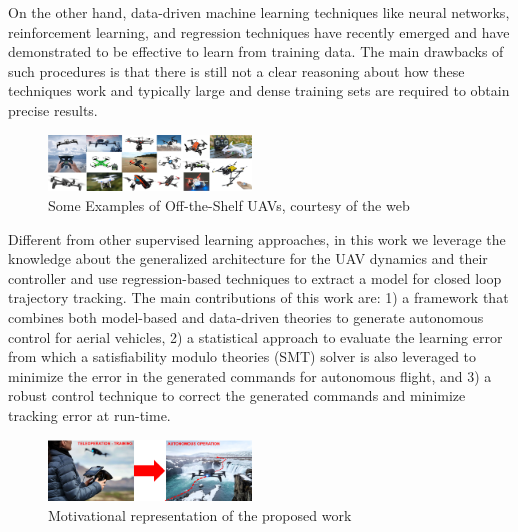 \documentclass[letterpaper, 10 pt, conference]{ieeeconf}  %
\newcommand\NB[1]{$\spadesuit$\footnote{NB: #1}}
\begin{document}
On the other hand, data-driven machine learning techniques like neural networks, reinforcement learning, and regression techniques have recently emerged and have demonstrated to be effective to learn from training data. The main drawbacks of such procedures is that there is still not a clear reasoning about how these techniques work and typically large and dense training sets are required to obtain precise results.
\begin{figure}[t]
    \includegraphics[width=0.48\textwidth]{images/quads.png}
    \vspace{-5pt}
    \caption{Some Examples of Off-the-Shelf UAVs, courtesy of the web}
    \label{fig:uavs}
    \vspace{-15pt}
\end{figure}

Different from other supervised learning approaches, in this work we leverage the knowledge about the generalized architecture for the UAV dynamics and their controller and use regression-based techniques to extract a model for closed loop trajectory tracking. The main contributions of this work are: 1) a framework that combines both model-based and data-driven theories to generate autonomous control for aerial vehicles, 2) a statistical approach to evaluate the learning error from which a satisfiability modulo theories (SMT) solver is also leveraged to minimize the error in the generated commands for autonomous flight, and 3) a robust control technique to correct the generated commands and minimize tracking error at run-time.

\begin{figure}[b]
    \vspace{-10pt}
    \includegraphics[width=0.48\textwidth]{images/motivation.png}
    \vspace{-5pt}
    \caption{Motivational representation of the proposed work}
    \label{fig:motiv}
    \vspace{-15pt}
\end{figure}
\end{document}
